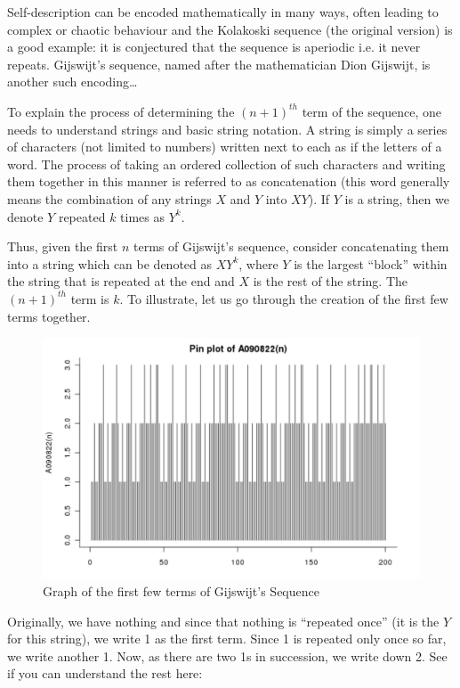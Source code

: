 \triast

Self-description can be encoded mathematically in many ways, often leading to complex or chaotic behaviour and the Kolakoski sequence (the original version) is a good example: it is conjectured that the sequence is aperiodic i.e. it never repeats. Gijswijt’s sequence, named after the mathematician Dion Gijswijt, is another such encoding…\par
To explain the process of determining the \((n+1)^{th}\) term of the sequence, one needs to understand strings and basic string notation. A string is simply a series of characters (not limited to numbers) written next to each as if the letters of a word. The process of taking an ordered collection of such characters and writing them together in this manner is referred to as concatenation (this word generally means the combination of any strings \(X\) and \(Y\) into \(XY\)). If \(Y\) is a string, then we denote \(Y\) repeated \(k\) times as \(Y^k\).\par
Thus, given the first \(n\) terms of Gijswijt’s sequence, consider concatenating them into a string which can be denoted as \(XY^k\), where \(Y\) is the largest “block” within the string that is repeated at the end and \(X\) is the rest of the string. The \((n+1)^{th}\) term is \(k\). To illustrate, let us go through the creation of the first few terms together.\par

\begin{figure}
\caption{Graph of the first few terms of Gijswijt's Sequence}
\centering
\includegraphics{Gijswijt.JPG}
\end{figure}

Originally, we have nothing and since that nothing is “repeated once” (it is the \(Y\) for this string), we write 1 as the first term. Since 1 is repeated only once so far, we write another 1. Now, as there are two 1s in succession, we write down 2. See if you can understand the rest here:\par

